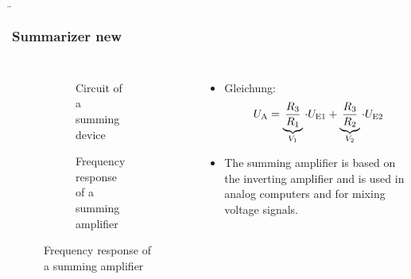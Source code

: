 \begin{frame}
    \b{
    \frametitle{Summarizer new}
    \begin{columns}
        \centering
        \begin{figure}
    \centering

    \begin{subfigure}{\linewidth}
        \centering
        \resizebox{0.6\linewidth}{!}{}
        \caption{Circuit of a summing device}
    \end{subfigure}

    \vspace{0.5cm} 

    \begin{subfigure}{\linewidth}
        \centering
        \resizebox{0.6\linewidth}{!}{}
        \caption{Frequency response of a summing amplifier}
    \end{subfigure}

\end{figure}

        \begin{itemize}
            \item Gleichung:
          \[
U_{\textnormal{A}} = \underbrace{\frac{R_3} {R_1}}_{V_1} \cdot U_{\textnormal{E1}} + \underbrace{\frac{R_3} {R_2}}_{V_2} \cdot U_{\textnormal{E2}}
\]
    \item The summing amplifier is based on the inverting amplifier and is used in analog computers and for mixing voltage signals.
        \end{itemize}
    \end{columns}
    }
\end{frame}


